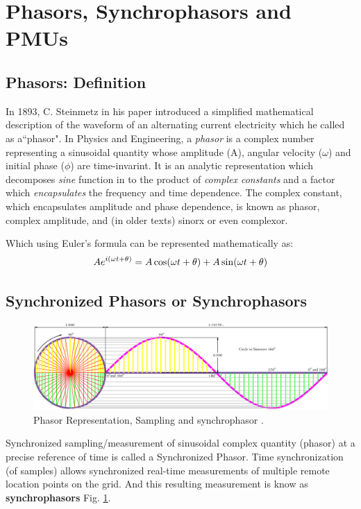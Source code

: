 \section{Phasors, Synchrophasors and PMUs}
\subsection{Phasors: Definition}

In 1893, C. Steinmetz in his paper introduced a simplified mathematical description of the waveform of an alternating current electricity which he called as a``phasor". In Physics and Engineering, a \emph{phasor} is a complex number representing a sinusoidal quantity whose amplitude (A), angular velocity ($\omega$) and initial phase ($\phi$) are time-invarint. It is an analytic representation which decomposes \emph{sine} function in to the product of \emph{complex constants} and a factor which \emph{encapsulates} the frequency and time dependence. The complex constant, which encapsulates amplitude and phase dependence, is known as phasor, complex amplitude, and (in older texts) sinorx or even complexor.

Which using Euler's formula can be represented mathematically as:
\begin{equation}\boldmath
Ae^{i(\omega t + \theta)} = A\cos(\omega t + \theta) + A\sin(\omega t + \theta)
\end{equation}

\subsection{Synchronized Phasors or Synchrophasors}
\begin{figure}
	\includegraphics[width=\textwidth]{fig/Circle-To-Sine-Wave.png}
	\caption{Phasor Representation, Sampling and synchrophasor \cite{CirSinWave} .} 
	\label{fig:CirSin}
\end{figure}
 Synchronized sampling/measurement of sinusoidal complex quantity (phasor) at a precise reference of time is called a Synchronized Phasor. Time synchronization (of samples) allows synchronized real-time measurements of multiple remote location points on the grid. And this resulting measurement is know as \textbf{synchrophasors} Fig. \ref{fig:CirSin}.
